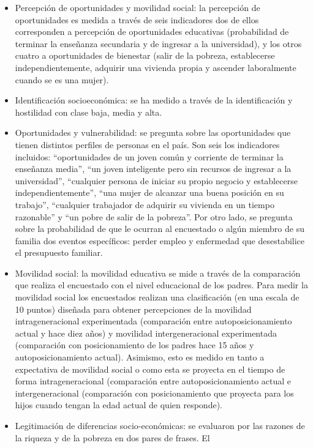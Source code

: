\documentclass[
  12pt,
]{book}
\begin{document}
\begin{itemize}
\item
  Percepción de oportunidades y movilidad social: la percepción de
  oportunidades es medida a través de seis indicadores dos de ellos
  corresponden a percepción de oportunidades educativas (probabilidad
  de terminar la enseñanza secundaria y de ingresar a la universidad),
  y los otros cuatro a oportunidades de bienestar (salir de la
  pobreza, establecerse independientemente, adquirir una vivienda
  propia y ascender laboralmente cuando se es una mujer).
\item
  Identificación socioeconómica: se ha medido a través de la
  identificación y hostilidad con clase baja, media y alta.
\item
  Oportunidades y vulnerabilidad: se pregunta sobre las oportunidades
  que tienen distintos perfiles de personas en el país. Son seis los
  indicadores incluidos: ``oportunidades de un joven común y corriente
  de terminar la enseñanza media'', ``un joven inteligente pero sin
  recursos de ingresar a la universidad'', ``cualquier persona de
  iniciar su propio negocio y establecerse independientemente'', ``una
  mujer de alcanzar una buena posición en su trabajo'', ``cualquier
  trabajador de adquirir su vivienda en un tiempo razonable'' y ``un
  pobre de salir de la pobreza''. Por otro lado, se pregunta sobre la
  probabilidad de que le ocurran al encuestado o algún miembro de su
  familia dos eventos específicos: perder empleo y enfermedad que
  desestabilice el presupuesto familiar.
\item
  Movilidad social: la movilidad educativa se mide a través de la
  comparación que realiza el encuestado con el nivel educacional de
  los padres. Para medir la movilidad social los encuestados realizan
  una clasificación (en una escala de 10 puntos) diseñada para obtener
  percepciones de la movilidad intrageneracional experimentada
  (comparación entre autoposicionamiento actual y hace diez años) y
  movilidad intergeneracional experimentada (comparación con
  posicionamiento de los padres hace 15 años y autoposicionamiento
  actual). Asimismo, esto es medido en tanto a expectativa de
  movilidad social o como esta se proyecta en el tiempo de forma
  intrageneracional (comparación entre autoposicionamiento actual e
  intergeneracional (comparación con posicionamiento que proyecta para
  los hijos cuando tengan la edad actual de quien responde).
\item
  Legitimación de diferencias socio-económicas: se evaluaron por las
  razones de la riqueza y de la pobreza en dos pares de frases. El

\end{itemize}
\end{document}
